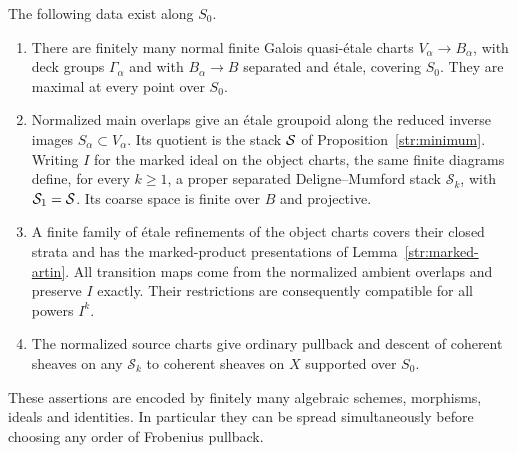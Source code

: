 \begin{proposition}\label{str:products}
The following data exist along $S_0$.
\begin{enumerate}
\item There are finitely many normal finite Galois quasi-\'etale charts
$V_\alpha\to B_\alpha$, with deck groups $\Gamma_\alpha$ and with
$B_\alpha\to B$ separated and \'etale, covering $S_0$.
They are maximal at every point over $S_0$.
\item Normalized main overlaps give an \'etale groupoid along the
reduced inverse images $S_\alpha\subset V_\alpha$.  Its quotient is
the stack $\mathcal S$ of Proposition~\ref{str:minimum}.  Writing $I$ for the
marked ideal on the object charts, the same finite diagrams define,
for every $k\geq1$, a proper separated Deligne--Mumford stack
$\mathcal S_k$, with $\mathcal S_1=\mathcal S$.  Its coarse space is finite
over $B$ and projective.
\item A finite family of \'etale refinements of the object charts
covers their closed strata and has the marked-product presentations of
Lemma~\ref{str:marked-artin}.  All transition maps come from the
normalized ambient overlaps and preserve $I$ exactly.  Their
restrictions are consequently compatible for all powers $I^k$.
\item The normalized source charts give ordinary pullback and descent
of coherent sheaves on any $\mathcal S_k$ to coherent sheaves on $X$
supported over $S_0$.
\end{enumerate}
These assertions are encoded by finitely many algebraic schemes,
morphisms, ideals and identities.  In particular they can be spread
simultaneously before choosing any order of Frobenius pullback.
\end{proposition}

